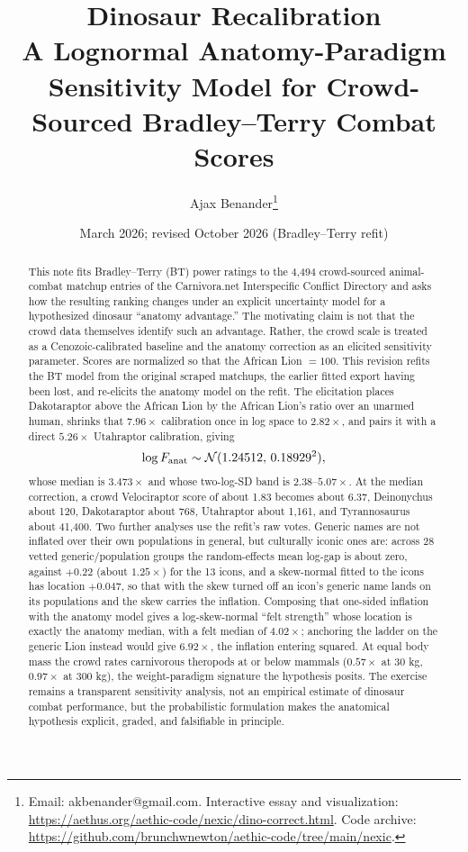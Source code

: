 \documentclass[11pt]{article}
\title{\textbf{Dinosaur Recalibration}\\[5pt]
\large A Lognormal Anatomy-Paradigm Sensitivity Model for Crowd-Sourced Bradley--Terry Combat Scores}
\author{Ajax Benander\thanks{Email: akbenander@gmail.com. Interactive essay and visualization: \url{https://aethus.org/aethic-code/nexic/dino-correct.html}. Code archive: \url{https://github.com/brunchwnewton/aethic-code/tree/main/nexic}.}}
\date{March 2026; revised October 2026 (Bradley--Terry refit)}
\begin{document}
\maketitle

\begin{abstract}
This note fits Bradley--Terry (BT) power ratings to the 4,494 crowd-sourced animal-combat matchup entries of the Carnivora.net Interspecific Conflict Directory and asks how the resulting ranking changes under an explicit uncertainty model for a hypothesized dinosaur ``anatomy advantage.'' The motivating claim is not that the crowd data themselves identify such an advantage. Rather, the crowd scale is treated as a Cenozoic-calibrated baseline and the anatomy correction as an elicited sensitivity parameter. Scores are normalized so that the African Lion $=100$. This revision refits the BT model from the original scraped matchups, the earlier fitted export having been lost, and re-elicits the anatomy model on the refit. The elicitation places Dakotaraptor above the African Lion by the African Lion's ratio over an unarmed human, shrinks that $7.96\times$ calibration once in log space to $2.82\times$, and pairs it with a direct $5.26\times$ Utahraptor calibration, giving
\[
\log F_{\rm anat}\sim\mathcal N(1.24512,\,0.18929^2),
\]
whose median is $3.473\times$ and whose two-log-SD band is $2.38$--$5.07\times$. At the median correction, a crowd Velociraptor score of about 1.83 becomes about 6.37, Deinonychus about 120, Dakotaraptor about 768, Utahraptor about 1,161, and Tyrannosaurus about 41,400. Two further analyses use the refit's raw votes. Generic names are not inflated over their own populations in general, but culturally iconic ones are: across 28 vetted generic/population groups the random-effects mean log-gap is about zero, against $+0.22$ (about $1.25\times$) for the 13 icons, and a skew-normal fitted to the icons has location $+0.047$, so that with the skew turned off an icon's generic name lands on its populations and the skew carries the inflation. Composing that one-sided inflation with the anatomy model gives a log-skew-normal ``felt strength'' whose location is exactly the anatomy median, with a felt median of $4.02\times$; anchoring the ladder on the generic Lion instead would give $6.92\times$, the inflation entering squared. At equal body mass the crowd rates carnivorous theropods at or below mammals ($0.57\times$ at 30 kg, $0.97\times$ at 300 kg), the weight-paradigm signature the hypothesis posits. The exercise remains a transparent sensitivity analysis, not an empirical estimate of dinosaur combat performance, but the probabilistic formulation makes the anatomical hypothesis explicit, graded, and falsifiable in principle.
\end{abstract}
\end{document}
